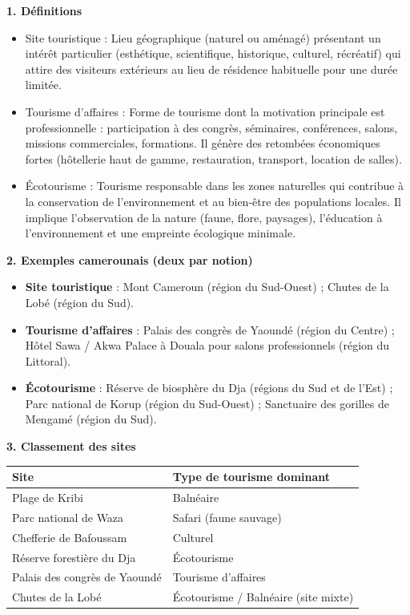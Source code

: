 \documentclass[11pt]{article}
\newcommand{\cle}[1]{{\popxbold\color{popdark}#1}}
\begin{document}
\begin{corrige}
\textbf{1. Définitions}
\begin{itemize}
\item \cle{Site touristique} : Lieu géographique (naturel ou aménagé) présentant un intérêt particulier (esthétique, scientifique, historique, culturel, récréatif) qui attire des visiteurs extérieurs au lieu de résidence habituelle pour une durée limitée.
\item \cle{Tourisme d'affaires} : Forme de tourisme dont la motivation principale est professionnelle : participation à des congrès, séminaires, conférences, salons, missions commerciales, formations. Il génère des retombées économiques fortes (hôtellerie haut de gamme, restauration, transport, location de salles).
\item \cle{Écotourisme} : Tourisme responsable dans les zones naturelles qui contribue à la conservation de l'environnement et au bien-être des populations locales. Il implique l'observation de la nature (faune, flore, paysages), l'éducation à l'environnement et une empreinte écologique minimale.
\end{itemize}

\textbf{2. Exemples camerounais (deux par notion)}
\begin{itemize}
\item \textbf{Site touristique} : Mont Cameroun (région du Sud-Ouest) ; Chutes de la Lobé (région du Sud).
\item \textbf{Tourisme d'affaires} : Palais des congrès de Yaoundé (région du Centre) ; Hôtel Sawa / Akwa Palace à Douala pour salons professionnels (région du Littoral).
\item \textbf{Écotourisme} : Réserve de biosphère du Dja (régions du Sud et de l'Est) ; Parc national de Korup (région du Sud-Ouest) ; Sanctuaire des gorilles de Mengamé (région du Sud).
\end{itemize}

\textbf{3. Classement des sites}
\begin{center}
\begin{tabularx}{\linewidth}{|l|X|}\hline
\rowcolor{popblueL} \textbf{Site} & \textbf{Type de tourisme dominant} \\ \hline
Plage de Kribi & Balnéaire \\ \hline
Parc national de Waza & Safari (faune sauvage) \\ \hline
Chefferie de Bafoussam & Culturel \\ \hline
Réserve forestière du Dja & Écotourisme \\ \hline
Palais des congrès de Yaoundé & Tourisme d'affaires \\ \hline
Chutes de la Lobé & Écotourisme / Balnéaire (site mixte) \\ \hline
\end{tabularx}
\end{center}
\end{corrige}
\end{document}
